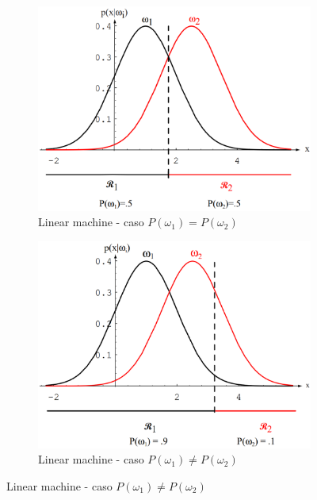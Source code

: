 \documentclass[a4paper,oneside,titlepage]{book}
\begin{document}
\begin{figure}[htp]
	\begin{subfigure}{0.49\textwidth}
	    \centering
		\includegraphics[width=\textwidth, height=\textheight, keepaspectratio]{1D-prior-uguali.png}
		\caption{Linear machine - caso $P(\omega_1) = P(\omega_2)$}
	\end{subfigure}
	\hfill
	\begin{subfigure}{0.49\textwidth}
	    \centering
		\includegraphics[width=\textwidth, height=\textheight, keepaspectratio]{1D-prior-diversi.png}
		\caption{Linear machine - caso $P(\omega_1) \neq P(\omega_2)$}
	\end{subfigure}
\end{figure}
\end{document}
